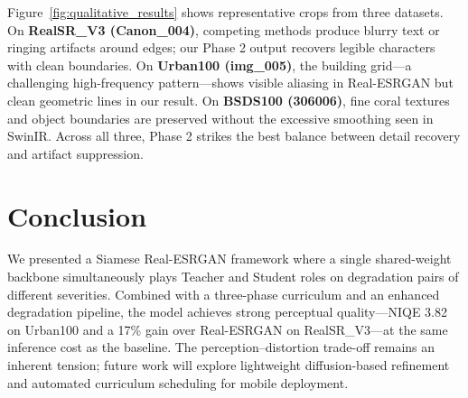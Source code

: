\documentclass[runningheads]{llncs}
\begin{document}
Figure~\ref{fig:qualitative_results} shows representative crops from three datasets. On \textbf{RealSR\_V3 (Canon\_004)}, competing methods produce blurry text or ringing artifacts around edges; our Phase 2 output recovers legible characters with clean boundaries. On \textbf{Urban100 (img\_005)}, the building grid—a challenging high-frequency pattern—shows visible aliasing in Real-ESRGAN but clean geometric lines in our result. On \textbf{BSDS100 (306006)}, fine coral textures and object boundaries are preserved without the excessive smoothing seen in SwinIR. Across all three, Phase 2 strikes the best balance between detail recovery and artifact suppression.


\section{Conclusion}

We presented a Siamese Real-ESRGAN framework where a single shared-weight backbone simultaneously plays Teacher and Student roles on degradation pairs of different severities. Combined with a three-phase curriculum and an enhanced degradation pipeline, the model achieves strong perceptual quality—NIQE 3.82 on Urban100 and a 17\% gain over Real-ESRGAN on RealSR\_V3—at the same inference cost as the baseline. The perception--distortion trade-off remains an inherent tension; future work will explore lightweight diffusion-based refinement and automated curriculum scheduling for mobile deployment.



\end{document}
